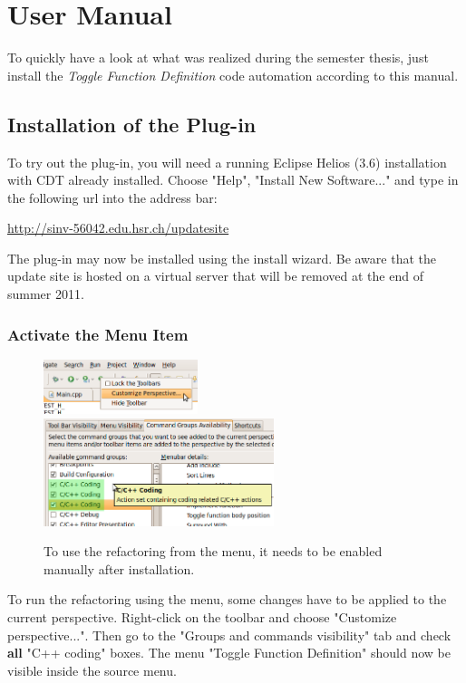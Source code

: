 \chapter{User Manual}
\thispagestyle{fancy}

To quickly have a look at what was realized during the semester thesis, just 
install the \textit{Toggle Function Definition} code automation according to 
this manual.

\section{Installation of the Plug-in}

To try out the plug-in, you will need a running Eclipse Helios (3.6) installation with CDT already installed. Choose "Help", "Install New Software..." and type in the following url into the address bar:

\url{http://sinv-56042.edu.hsr.ch/updatesite}

The plug-in may now be installed using the install wizard. Be aware that the 
update site is hosted on a virtual server that will be removed at the end of 
summer 2011.

\subsection{Activate the Menu Item}

\begin{figure}[h]
\includegraphics[width=0.4\textwidth]{images/customizeperspective.png}
\includegraphics[width=0.6\textwidth]{images/commandgroups.png}
\caption{To use the refactoring from the menu, it needs to be enabled manually 
after installation.}
\label{showMenu}
\end{figure}
\label{cmdGroup}
To run the refactoring using the menu, some changes have to be applied to the 
current perspective. Right-click on the toolbar and choose 
"Customize perspective...". Then go to the "Groups and commands visibility" tab 
and check \textbf{all} "C++ coding" boxes. The menu "Toggle Function Definition" 
should now be visible inside the source menu.

